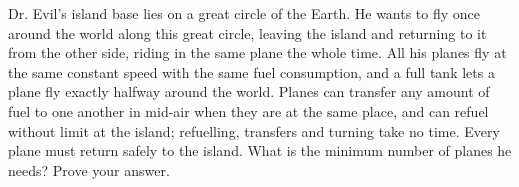 Dr. Evil's island base lies on a great circle of the Earth. He wants to fly once around the world along this great circle, leaving the island and returning to it from the other side, riding in the same plane the whole time. All his planes fly at the same constant speed with the same fuel consumption, and a full tank lets a plane fly exactly halfway around the world. Planes can transfer any amount of fuel to one another in mid-air when they are at the same place, and can refuel without limit at the island; refuelling, transfers and turning take no time. Every plane must return safely to the island. What is the minimum number of planes he needs? Prove your answer.

